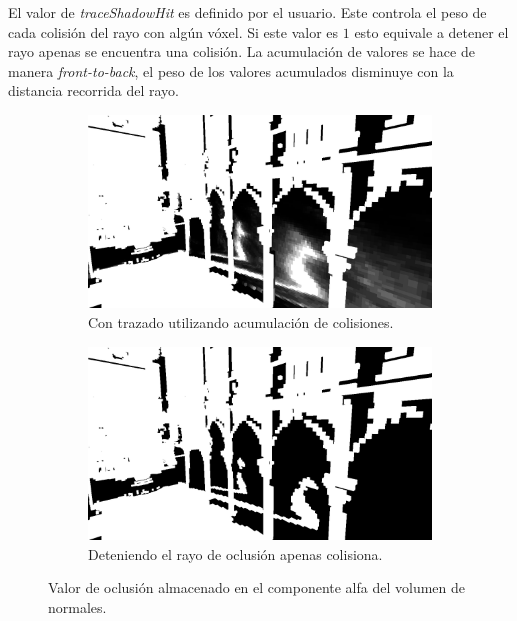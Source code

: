 El valor de \emph{traceShadowHit} es definido por el usuario. Este controla el peso de cada colisión del rayo con algún vóxel. Si este valor es $1$ esto equivale a detener el rayo apenas se encuentra una colisión. La acumulación de valores se hace de manera \emph{front-to-back}, el peso de los valores acumulados disminuye con la distancia recorrida del rayo.

\begin{figure}[H]
	\centering
	\begin{subfigure}[t]{0.49\textwidth}
		\centering
		\captionsetup{justification=centering}
		\includegraphics[width=\linewidth]{media/soft_traced.png}
		\caption*{Con trazado utilizando acumulación de colisiones.}
	\end{subfigure}%
	\hspace{0.01\textwidth}
	\begin{subfigure}[t]{0.49\textwidth}
		\centering
		\captionsetup{justification=centering}
		\includegraphics[width=\linewidth]{media/hard_traced.png}
		\caption*{Deteniendo el rayo de oclusión apenas colisiona.}
	\end{subfigure}%
	\caption{Valor de oclusión almacenado en el componente alfa del volumen de normales.}
	\label{fig:vshadows_hit}
\end{figure}


